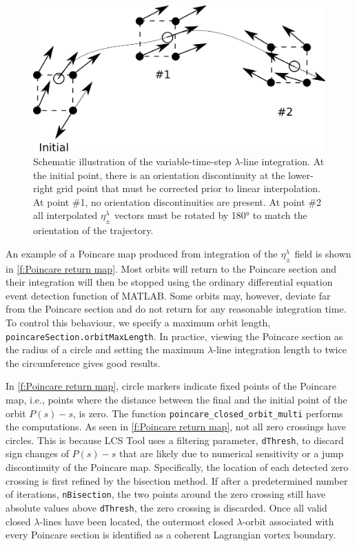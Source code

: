 \documentclass{elsarticle}
\begin{document}
\begin{figure}
\begin{center}
\includegraphics[width=.8\textwidth]{graphics/variable_step_integration}
\end{center}
\caption{Schematic illustration of the variable-time-step $\lambda$-line integration. At the initial point, there is an orientation discontinuity at the lower-right grid point that must be corrected prior to linear interpolation. At point \#1, no orientation discontinuities are present. At point \#2 all interpolated $\eta_\pm^\lambda$ vectors must be rotated by 180° to match the orientation of the trajectory.}
\label{f:variable step integration}
\end{figure}

An example of a Poincare map produced from integration of the $\eta_\pm^\lambda$ field is shown in \cref{f:Poincare return map}. Most orbits will return to the Poincare section and their integration will then be stopped using the ordinary differential equation event detection function of MATLAB. Some orbits may, however, deviate far from the Poincare section and do not return for any reasonable integration time. To control this behaviour, we specify a maximum orbit length, \lstinline!poincareSection.orbitMaxLength!. In practice, viewing the Poincare section as the radius of a circle and setting the maximum $\lambda$-line integration length to twice the circumference gives good results.

In \cref{f:Poincare return map}, circle markers indicate fixed points of the Poincare map, i.e., points where the distance between the final and the initial point of the orbit $P(s) - s$, is zero. The function \lstinline!poincare_closed_orbit_multi! performs the computations. As seen in \cref{f:Poincare return map}, not all zero crossings have circles. This is because LCS Tool uses a filtering parameter, \lstinline!dThresh!, to discard sign changes of $P(s) - s$ that are likely due to numerical sensitivity or a jump discontinuity of the Poincare map. Specifically, the location of each detected zero crossing is first refined by the bisection method. If after a predetermined number of iterations, \lstinline!nBisection!, the two points around the zero crossing still have absolute values above \lstinline!dThresh!, the zero crossing is discarded.  Once all valid closed $\lambda$-lines have been located, the outermost closed $\lambda$-orbit associated with every Poincare section is identified as a coherent Lagrangian vortex boundary.
\end{document}
